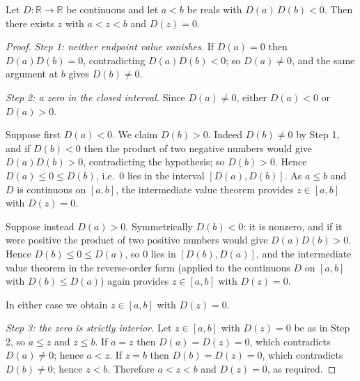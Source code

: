 \begin{lemma}
Let $D\colon\mathbb{R}\to\mathbb{R}$ be continuous and let $a<b$ be reals with
$D(a)\,D(b)<0$. Then there exists $z$ with $a<z<b$ and $D(z)=0$.
\end{lemma}
\begin{proof}
\emph{Step 1: neither endpoint value vanishes.} If $D(a)=0$ then
$D(a)D(b)=0$, contradicting $D(a)D(b)<0$; so $D(a)\ne 0$, and the same argument
at $b$ gives $D(b)\ne 0$.

\emph{Step 2: a zero in the closed interval.} Since $D(a)\ne0$, either
$D(a)<0$ or $D(a)>0$.

Suppose first $D(a)<0$. We claim $D(b)>0$. Indeed $D(b)\ne 0$ by Step 1, and if
$D(b)<0$ then the product of two negative numbers would give $D(a)D(b)>0$,
contradicting the hypothesis; so $D(b)>0$. Hence $D(a)\le 0\le D(b)$, i.e.\ $0$
lies in the interval $[D(a),D(b)]$. As $a\le b$ and $D$ is continuous on
$[a,b]$, the intermediate value theorem provides $z\in[a,b]$ with $D(z)=0$.

Suppose instead $D(a)>0$. Symmetrically $D(b)<0$: it is nonzero, and if it were
positive the product of two positive numbers would give $D(a)D(b)>0$. Hence
$D(b)\le 0\le D(a)$, so $0$ lies in $[D(b),D(a)]$, and the intermediate value
theorem in the reverse-order form (applied to the continuous $D$ on $[a,b]$ with
$D(b)\le D(a)$) again provides $z\in[a,b]$ with $D(z)=0$.

In either case we obtain $z\in[a,b]$ with $D(z)=0$.

\emph{Step 3: the zero is strictly interior.} Let $z\in[a,b]$ with $D(z)=0$ be
as in Step 2, so $a\le z$ and $z\le b$. If $a=z$ then $D(a)=D(z)=0$, which
contradicts $D(a)\ne 0$; hence $a<z$. If $z=b$ then $D(b)=D(z)=0$, which
contradicts $D(b)\ne 0$; hence $z<b$. Therefore $a<z<b$ and $D(z)=0$, as
required.
\end{proof}
